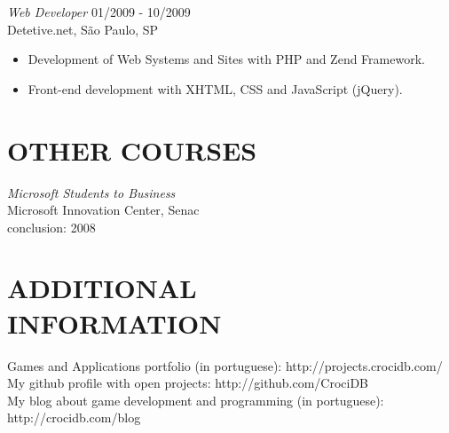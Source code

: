 \documentclass[line,margin]{res}
\begin{document}
\begin{resume}
                {\sl Web Developer} \hfill 01/2009 - 10/2009 \\
                Detetive.net, São Paulo, SP
                 \begin{itemize}  \itemsep -2pt %
                 \item Development of Web Systems and Sites with PHP and Zend Framework.
                 \item Front-end development with XHTML, CSS and JavaScript (jQuery).
                 \end{itemize} 

\section{OTHER COURSES}             
           {\sl Microsoft Students to Business} \\
                Microsoft Innovation Center, Senac \\
                conclusion: 2008 


\section{ADDITIONAL \\ INFORMATION}             
            Games and Applications portfolio (in portuguese): http://projects.crocidb.com/ \\
            My github profile with open projects: http://github.com/CrociDB \\
            My blog about game development and programming (in portuguese): http://crocidb.com/blog
 

\end{resume}
\end{document}
